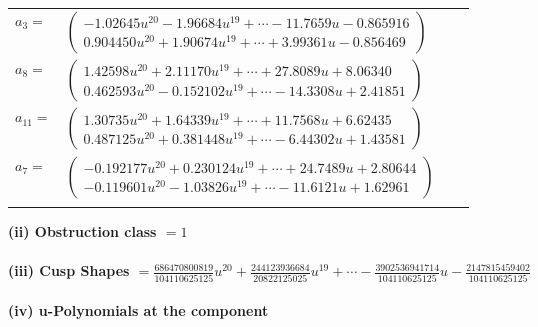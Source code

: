 \documentclass[1p]{elsarticle_modified}
\theoremstyle{definition}
\begin{document}
\begin{tabular}{m{7pt} m{180pt} m{7pt} m{180pt} }
\flushright $a_{3}=$&$\begin{pmatrix}-1.02645 u^{20}-1.96684 u^{19}+\cdots-11.7659 u-0.865916\\0.904450 u^{20}+1.90674 u^{19}+\cdots+3.99361 u-0.856469\end{pmatrix}$ \\
\flushright $a_{8}=$&$\begin{pmatrix}1.42598 u^{20}+2.11170 u^{19}+\cdots+27.8089 u+8.06340\\0.462593 u^{20}-0.152102 u^{19}+\cdots-14.3308 u+2.41851\end{pmatrix}$ \\
\flushright $a_{11}=$&$\begin{pmatrix}1.30735 u^{20}+1.64339 u^{19}+\cdots+11.7568 u+6.62435\\0.487125 u^{20}+0.381448 u^{19}+\cdots-6.44302 u+1.43581\end{pmatrix}$ \\
\flushright $a_{7}=$&$\begin{pmatrix}-0.192177 u^{20}+0.230124 u^{19}+\cdots+24.7489 u+2.80644\\-0.119601 u^{20}-1.03826 u^{19}+\cdots-11.6121 u+1.62961\end{pmatrix}$\\&\end{tabular}
\flushleft \textbf{(ii) Obstruction class $= 1$}\\~\\
\flushleft \textbf{(iii) Cusp Shapes $= \frac{686470800819}{104110625125} u^{20}+\frac{244123936684}{20822125025} u^{19}+\cdots-\frac{3902536941714}{104110625125} u-\frac{2147815459402}{104110625125}$}\\~\\
\newpage\renewcommand{\arraystretch}{1}
\flushleft \textbf{(iv) u-Polynomials at the component}\newline \\
\end{document}
